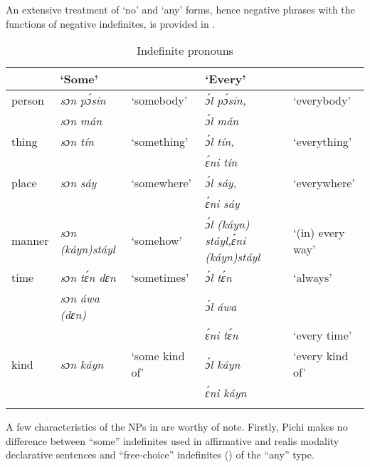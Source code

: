 An extensive treatment of ‘no’ and ‘any’ forms, hence negative phrases with the functions of negative indefinites, is provided in .


\begin{table}
\caption{Indefinite pronouns}
\label{tab:key:5.8}

\begin{tabularx}{\textwidth}{lXlXl}
\lsptoprule
 & ‘Some’ &  & ‘Every’ & \\
 \midrule 
person & \itshape sɔn pɔ́sin & ‘somebody’ & \itshape ɔ́l pɔ́sin, & ‘everybody’\\
& \itshape sɔn mán &  & \itshape ɔ́l mán & \\

\tablevspace
thing & \itshape sɔn tín & ‘something’ & \itshape ɔ́l tín, & ‘everything’\\
&  &  & \itshape ɛ́ni tín & \\

\tablevspace
place & \itshape sɔn sáy & ‘somewhere’ & \itshape ɔ́l sáy, & ‘everywhere’\\
&  &  & \itshape ɛ́ni sáy & \\
\tablevspace
manner & \itshape sɔn (káyn)\newline stáyl & ‘somehow’ & \itshape ɔ́l (káyn) stáyl,\newline ɛ́ni (káyn)\newline stáyl & ‘(in) every way’\\
\tablevspace
time & \itshape sɔn tɛ́n dɛn & ‘sometimes’ & \itshape ɔ́l tɛ́n & ‘always’\\
& \itshape sɔn áwa (dɛn) &  & \itshape ɔ́l áwa & \\
&  &  & \itshape ɛ́ni tɛ́n & ‘every time’\\
\tablevspace
kind & \itshape sɔn káyn & ‘some kind of’ & \itshape ɔ́l káyn & ‘every kind of’\\
&  &  & \itshape ɛ́ni káyn & \\
\lspbottomrule
\end{tabularx}
\end{table}

A few characteristics of the NPs in  are worthy of note. Firstly, Pichi makes no difference between “some” indefinites used in affirmative and realis modality declarative sentences and “free-choice” indefinites (\citealt[48–52]{Haspelmath1997}) of the “any” type.


